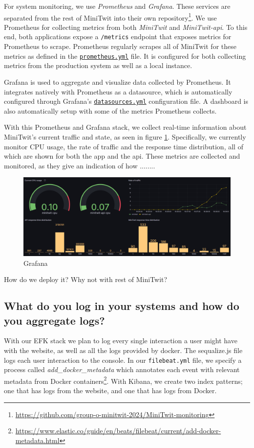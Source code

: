 \documentclass[11pt]{article}
\begin{document}
For system monitoring, we use \textit{Prometheus} and \textit{Grafana}. These services are separated from the rest of MiniTwit into their own repository\footnote{\url{https://github.com/group-o-minitwit-2024/MiniTwit-monitoring}}. We use Prometheus for collecting metrics from both \textit{MiniTwit} and \textit{MiniTwit-api}. To this end, both applications expose a \texttt{/metrics} endpoint that exposes metrics for Prometheus to scrape. Prometheus regularly scrapes all of MiniTwit for these metrics as defined in the \href{https://github.com/group-o-minitwit-2024/MiniTwit-monitoring/blob/main/prometheus/prometheus.yml}{\texttt{prometheus.yml}} file. It is configured for both collecting metrics from the production system as well as a local instance. 

Grafana is used to aggregate and visualize data collected by Prometheus. It integrates natively with Prometheus as a datasource, which is automatically configured through Grafana's \href{https://github.com/group-o-minitwit-2024/MiniTwit-monitoring/blob/main/grafana/provisioning/datasources/datasources.yaml}{\texttt{datasources.yml}} configuration file. A dashboard is also automatically setup with some of the metrics Prometheus collects. 

With this Prometheus and Grafana stack, we collect real-time information about MiniTwit's current traffic and state, as seen in figure \ref{fig:grafana}. Specifically, we currently monitor CPU usage, the rate of traffic and the response time distribution, all of which are shown for both the app and the api. These metrics are collected and monitored, as they give an indication of how ........

\begin{figure}[h]
    \centering
    \includegraphics[width=0.75\linewidth]{images/grafana.png}
    \caption{Grafana}
    \label{fig:grafana}
\end{figure}

How do we deploy it?
    Why not with rest of MiniTwit?


\subsection{What do you log in your systems and how do you aggregate logs?}
With our EFK stack we plan to log every single interaction a user might have with the website, as well as all the logs provided by docker. The sequalize.js file logs each user interaction to the console. In our \texttt{filebeat.yml} file, we specify a process called \textit{add\_docker\_metadata} which annotates each event with relevant metadata from Docker containers\footnote{\url{https://www.elastic.co/guide/en/beats/filebeat/current/add-docker-metadata.html}}. With Kibana, we create two index patterns; one that has logs from the website, and one that has logs from Docker. 
\end{document}
